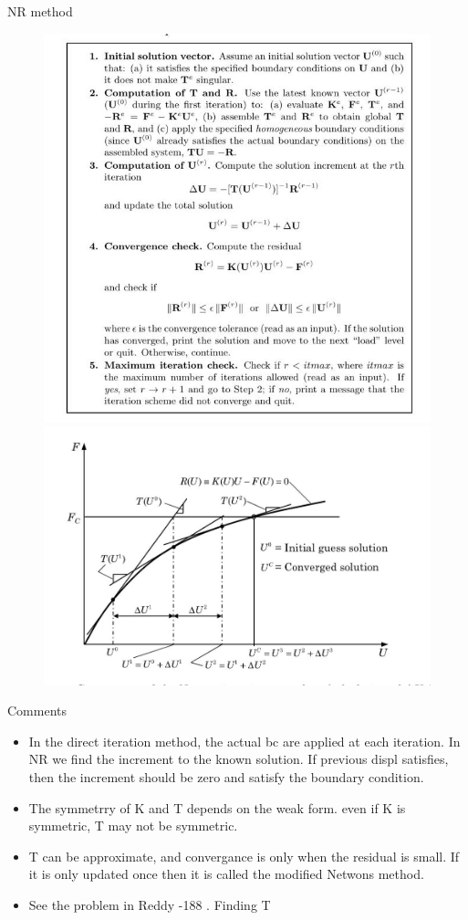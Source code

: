 	\begin{frame}{NR method}
		\begin{figure}
			\centering
			\includegraphics[width=0.5\linewidth]{Figure/fig15} 
			\includegraphics[width=0.45\linewidth]{Figure/fig16} 		
		\end{figure}	
	\end{frame}


	\begin{frame}{Comments}
		\begin{itemize}
			\item In the direct iteration method, the actual bc are applied at each iteration. In NR we find the increment to the known solution. If previous displ satisfies, then the increment should be zero and satisfy the boundary condition. 
			\item The symmetrry of K and T depends on the weak form. even if K is symmetric, T may not be symmetric.
			\item T can be approximate, and convergance is only when the residual is small. If it is only updated once then it is called the modified Netwons method.
			\item See the problem in Reddy -188 . Finding T	
		\end{itemize}
	\end{frame}


